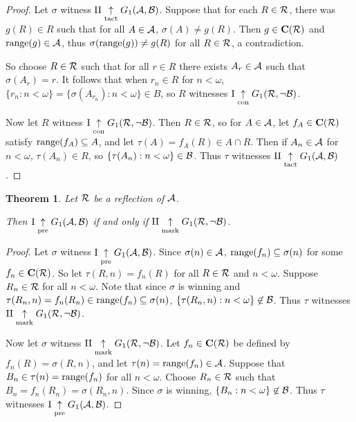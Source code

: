 \documentclass{amsart}
\theoremstyle{plain}
\newtheorem{theorem}{Theorem}
\theoremstyle{definition}
\theoremstyle{remark}
\theoremstyle{plain}
\theoremstyle{definition}
\theoremstyle{remark}
\begin{document}
\begin{proof}
  Let \(\sigma\) witness 
  \(\mathrm{II}\underset{\text{tact}}{\uparrow}G_{1}(\mathcal{A},\mathcal{B})\).
  Suppose that for each \(R\in\mathcal{R}\),
  there was \(g(R)\in R\) such that for all \(A\in \mathcal{A}\),
  \(\sigma(A)\not=g(R)\). Then \(g\in\mathbf C(\mathcal{R})\)
  and \(\text{range}(g)\in\mathcal{A}\),
  thus \(\sigma(\text{range}(g))\not=g(R)\) for all \(R\in\mathcal{R}\),
  a contradiction.

  So choose \(R\in\mathcal{R}\) such that for all \(r\in R\)
  there exists \(A_r\in\mathcal{A}\) such that \(\sigma(A_r)=r\).
  It follows that when \(r_n\in R\) for \(n<\omega\),
  \(\{r_n:n<\omega\}=\{\sigma(A_{r_n}):n<\omega\}\in B\),
  so \(R\) witnesses
  \(\mathrm{I}\underset{\text{con}}{\uparrow}G_{1}(\mathcal{R},\neg\mathcal{B})\).

  Now let \(R\) witness 
  \(\mathrm{I}\underset{\text{con}}{\uparrow}G_{1}(\mathcal{R},\neg\mathcal{B})\).
  Then \(R\in\mathcal{R}\), so for \(A\in\mathcal{A}\), let
  \(f_A\in\mathbf C(\mathcal{R})\) satisfy \(\text{range}(f_A)\subseteq A\),
  and let \(\tau(A)=f_A(R)\in A\cap R\).
  Then if \(A_n\in\mathcal{A}\) for \(n<\omega\), \(\tau(A_n)\in R\),
  so \(\{\tau(A_n):n<\omega\}\in\mathcal{B}\).
  Thus \(\tau\) witnesses
  \(\mathrm{II}\underset{\text{tact}}{\uparrow}G_{1}(\mathcal{A},\mathcal{B})\).
\end{proof}

\begin{theorem}
  Let \(\mathcal{R}\) be a reflection of \(\mathcal{A}\). 

  Then
  \(\mathrm{I}\underset{\text{pre}}{\uparrow}G_{1}(\mathcal{A},\mathcal{B})\) if and only if
  \(\mathrm{II}\underset{\text{mark}}{\uparrow}G_{1}(\mathcal{R},\neg\mathcal{B})\).
\end{theorem}

\begin{proof}
  Let \(\sigma\) witness 
  \(\mathrm{I}\underset{\text{pre}}{\uparrow}G_{1}(\mathcal{A},\mathcal{B})\).
  Since \(\sigma(n)\in\mathcal{A}\),
  \(\text{range}(f_n)\subseteq\sigma(n)\)
  for some \(f_n\in\mathbf C(\mathcal{R})\). So let
  \(\tau(R,n)=f_n(R)\) for all \(R\in \mathcal{R}\) and \(n<\omega\).
  Suppose \(R_n\in \mathcal{R}\) for all \(n<\omega\).
  Note that since \(\sigma\) is winning and 
  \(\tau(R_n,n)=f_n(R_n)\in\text{range}(f_n)\subseteq\sigma(n)\),
  \(\{\tau(R_n,n):n<\omega\}\not\in\mathcal{B}\). Thus \(\tau\) witnesses
  \(\mathrm{II}\underset{\text{mark}}{\uparrow}G_{1}(\mathcal{R},\neg\mathcal{B})\).

  Now let \(\sigma\) witness
  \(\mathrm{II}\underset{\text{mark}}{\uparrow}G_{1}(\mathcal{R},\neg\mathcal{B})\).
  Let \(f_n\in\mathbf C(\mathcal{R})\) be defined by \(f_n(R)=\sigma(R,n)\),
  and let \(\tau(n)=\text{range}(f_n)\in\mathcal{A}\). 
  Suppose that \(B_n\in\tau(n)=\text{range}(f_n)\) for
  all \(n<\omega\). Choose \(R_n\in\mathcal{R}\) such that 
  \(B_n=f_n(R_n)=\sigma(R_n,n)\). Since \(\sigma\) is winning,
  \(\{B_n:n<\omega\}\not\in\mathcal{B}\). Thus \(\tau\) witnesses
  \(\mathrm{I}\underset{\text{pre}}{\uparrow}G_{1}(\mathcal{A},\mathcal{B})\).
\end{proof}
\end{document}
